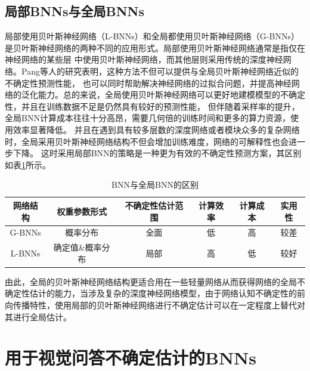 \subsection{局部BNNs与全局BNNs}
局部使用贝叶斯神经网络（L-BNNs）和全局都使用贝叶斯神经网络（G-BNNs）是贝叶斯神经网络的两种不同的应用形式。局部使用贝叶斯神经网络通常是指仅在神经网络的某些层
中使用贝叶斯神经网络，而其他层则采用传统的深度神经网络。Pang等人的研究表明\cite{Pang_Cheng_Hu_Liu_2021}，这种方法不但可以提供与全局贝叶斯神经网络近似的不确定性预测性能，
也可以同时帮助解决神经网络的过拟合问题，并提高神经网络的泛化能力。总的来说，全局使用贝叶斯神经网络可以更好地建模模型的不确定性，并且在训练数据不足是仍然具有较好的预测性能，
但伴随着采样率的提升，全局BNN计算成本往往十分高昂，需要几何倍的训练时间和更多的算力资源，使用效率显著降低。
并且在遇到具有较多层数的深度网络或者模块众多的复杂网络时，全局采用贝叶斯神经网络结构不但会增加训练难度，网络的可解释性也会进一步下降。
这时采用局部BNN的策略是一种更为有效的不确定性预测方案，其区别如表\ref{bnn-bnnlr}所示。
\begin{table}
	\caption{\label{bnn-bnnlr}BNN与全局BNN的区别}
	\centering
	\small %
	\begin{tabular}{c|ccccc}
        \hline 网络结构 & 权重参数形式 & 不确定性估计范围 & 计算效率 & 计算成本 &实用性\\
        \hline G-BNNs & 概率分布 & 全面 & 低 & 高 & 较差\\
		L-BNNs & 确定值\&概率分布 & 局部 & 高 & 低 & 较好\\
        \hline 
        \end{tabular}
\end{table}	
由此，全局的贝叶斯神经网络结构更适合用在一些轻量网络从而获得网络的全局不确定性估计的能力，当涉及复杂的深度神经网络模型，由于网络认知不确定性的前向传播特性\cite{gal2016dropout}，使用局部的贝叶斯神经网络进行不确定估计可以在一定程度上替代对其进行全局估计。

\section{用于视觉问答不确定估计的BNNs}
